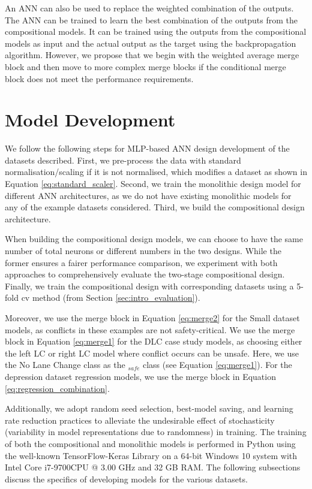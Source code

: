 An ANN can also be used to replace the weighted combination of the outputs. The ANN can be trained to learn the best combination of the outputs from the compositional models. It can be trained using the outputs from the compositional models as input and the actual output as the target using the backpropagation algorithm. However, we propose that we begin with the weighted average merge block and then move to more complex merge blocks if the conditional merge block does not meet the performance requirements.

% 





\section{Model Development}
\label{sec:sub_model}

We follow the following steps for MLP-based ANN design development of the datasets described. First, we pre-process the data with standard normalisation/scaling if it is not normalised, which modifies a dataset as shown in Equation \ref{eq:standard_scaler}. Second, we train the monolithic design model for different ANN architectures, as we do not have existing monolithic models for any of the example datasets considered. Third, we build the compositional design architecture.

When building the compositional design models, we can choose to have the same number of total neurons or different numbers in the two designs. While the former ensures a fairer performance comparison, we experiment with both approaches to comprehensively evaluate the two-stage compositional design. Finally, we train the compositional design with corresponding datasets using a 5-fold \gls{cv} method (from Section \ref{sec:intro_evaluation}). 

Moreover, we use the merge block in Equation \ref{eq:merge2} for the Small dataset models, as conflicts in these examples are not safety-critical. We use the merge block in Equation \ref{eq:merge1} for the DLC case study models, as choosing either the left LC or right LC model where conflict occurs can be unsafe. Here, we use the No Lane Change class as the $_{safe}$ class (see Equation \ref{eq:merge1}). For the depression dataset regression models, we use the merge block in Equation \ref{eq:regression_combination}.

Additionally, we adopt random seed selection, best-model saving, and learning rate reduction practices to alleviate the undesirable effect of stochasticity (variability in model representations due to randomness) in training. The training of both the compositional and monolithic models is performed in Python using the well-known TensorFlow-Keras Library on a 64-bit Windows 10 system with Intel Core i7-9700CPU @ 3.00 GHz and 32 GB RAM. The following subsections discuss the specifics of developing models for the various datasets.



